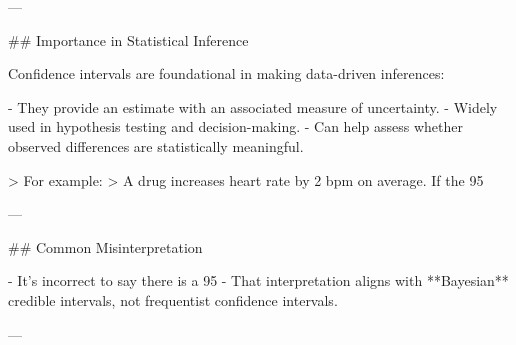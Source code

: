 ---

## Importance in Statistical Inference

Confidence intervals are foundational in making data-driven inferences:

- They provide an estimate with an associated measure of uncertainty.
- Widely used in hypothesis testing and decision-making.
- Can help assess whether observed differences are statistically meaningful.

> For example:  
> A drug increases heart rate by 2 bpm on average. If the 95%

---

## Common Misinterpretation

- It’s incorrect to say there is a 95%
- That interpretation aligns with **Bayesian** credible intervals, not frequentist confidence intervals.

---
